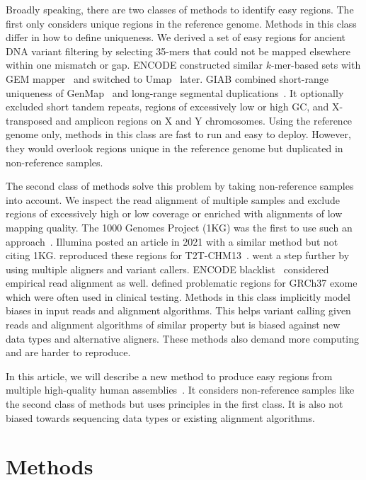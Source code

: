 \documentclass[webpdf,contemporary,large,namedate]{oup-authoring-template}%
\begin{document}
Broadly speaking, there are two classes of methods to identify easy regions.
The first only considers unique regions in the reference genome.
Methods in this class differ in how to define uniqueness.
We derived a set of easy regions for ancient DNA variant filtering by selecting 35-mers that could not be mapped elsewhere within one mismatch or gap.
ENCODE constructed similar $k$-mer-based sets with GEM mapper~\citep{Marco-Sola:2012kx}
and switched to Umap~\citep{Karimzadeh:2018aa} later.
GIAB combined short-range uniqueness of GenMap~\citep{Pockrandt:2020aa}
and long-range segmental duplications~\citep{Dwarshuis:2024aa}.
It optionally excluded short tandem repeats, regions of excessively low or high GC, and X-transposed and amplicon regions on X and Y chromosomes.
Using the reference genome only, methods in this class are fast to run and easy to deploy.
However, they would overlook regions unique in the reference genome but duplicated in non-reference samples.

The second class of methods solve this problem by taking non-reference samples into account.
We inspect the read alignment of multiple samples and exclude regions of excessively high or low coverage or enriched with alignments of low mapping quality.
The 1000 Genomes Project (1KG) was the first to use such an approach~\citep{1000-Genomes-Project-Consortium:2010qc}.
Illumina posted an article in 2021 with a similar method but not citing 1KG.
\citet{Aganezov:2022aa} reproduced these regions for T2T-CHM13~\citep{Nurk:2022up}.
\citet{Pan:2022aa} went a step further by using multiple aligners and variant callers.
ENCODE blacklist~\citep{Amemiya:2019aa} considered empirical read alignment as well.
\citet{Mandelker:2016aa} defined problematic regions for GRCh37 exome which were often used in clinical testing.
Methods in this class implicitly model biases in input reads and alignment algorithms.
This helps variant calling given reads and alignment algorithms of similar property
but is biased against new data types and alternative aligners.
These methods also demand more computing and are harder to reproduce.

In this article, we will describe a new method to produce easy regions from multiple high-quality human assemblies~\citep{Liao:2023aa}.
It considers non-reference samples like the second class of methods but uses principles in the first class.
It is also not biased towards sequencing data types or existing alignment algorithms.

\section{Methods}
\end{document}
